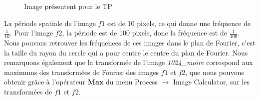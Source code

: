 \documentclass[a4paper,11pt]{article}
\begin{document}
  \begin{figure}[H]
   \centering
   \caption{Image présentent pour le TP}
  \end{figure}

  La période spatiale de l’image $f1$ est de 10 pixels, ce qui donne une fréquence de $\frac{1}{10}$. Pour l’image $f2$, la période est de 100 pixels, 
  donc la fréquence est de $\frac{1}{100}$. Nous pouvons retrouver les fréquences de ces images dans le plan de Fourier, c’est la taille du rayon du cercle 
  qui a pour centre le centre du plan de Fourier. Nous remarquons également que la transformée de l’image \textit{1024\_moire} correspond aux maximums  
  des transformées de Fourier des images $f1$ et $f2$, que nous pouvons obtenir grâce à l’opérateur \textbf{Max} du menu Process $\rightarrow$ Image Calculator, 
  sur les transformées de $f1$ et $f2$.\\
  
\end{document}
